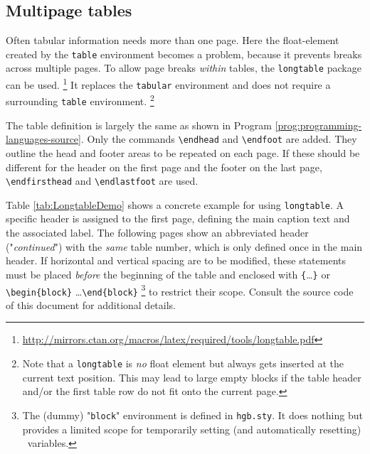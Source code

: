 \subsection{Multipage tables}

Often tabular information needs more than one page. Here the float-element
created by the \texttt{table} environment becomes a problem, because it
prevents breaks across multiple pages. To allow page breaks \emph{within}
tables, the \texttt{longtable} package can be used.%
\footnote{%
\url{http://mirrors.ctan.org/macros/latex/required/tools/longtable.pdf}}
It replaces the \texttt{tabular} environment and does not require a
surrounding \texttt{table} environment.%
\footnote{Note that a \texttt{longtable} is \emph{no} float element but 
always gets inserted at the current text position. This may lead to large
empty blocks if the table header and/or the first table row do not fit onto
the current page.}

The table definition is largely the same as shown in Program
\ref{prog:programming-languages-source}. Only the commands \verb|\endhead|
and \verb|\endfoot| are added. They outline the head and footer areas to be
repeated on each page. If these should be different for the header on the
first page and the footer on the last page, \verb|\endfirsthead| and
\verb|\endlastfoot| are used.

Table \ref{tab:LongtableDemo} shows a concrete example for using 
\texttt{longtable}. A specific header is assigned to the first page, 
defining the main caption text and the associated label.
The following pages show an abbreviated header ("\emph{continued}") with the
\emph{same} table number, which is only defined once in the main header. 
If horizontal and vertical spacing are to be modified, these statements must
be placed \emph{before} the beginning of the table and enclosed with
\verb|{|\ldots\verb|}| or \verb|\begin{block}| \ldots \verb|\end{block}|%
\footnote{The (dummy) "\texttt{block}" environment is defined in 
\texttt{hgb.sty}. It does nothing but provides a limited scope for
temporarily setting (and automatically resetting) \latex\ variables.}
to restrict their scope. Consult the source code of this document for
additional details.

